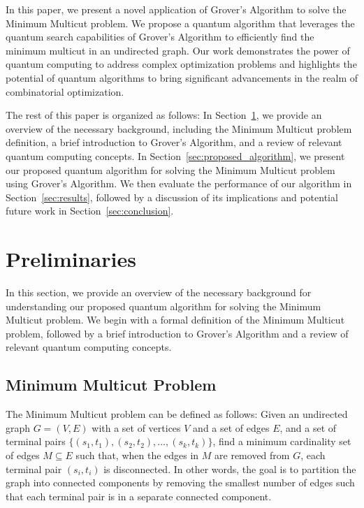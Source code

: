 In this paper, we present a novel application of Grover's Algorithm to solve the Minimum Multicut problem. We propose a quantum algorithm that leverages the quantum search capabilities of Grover's Algorithm to efficiently find the minimum multicut in an undirected graph. Our work demonstrates the power of quantum computing to address complex optimization problems and highlights the potential of quantum algorithms to bring significant advancements in the realm of combinatorial optimization.

The rest of this paper is organized as follows: In Section~\ref{sec:preliminaries}, we provide an overview of the necessary background, including the Minimum Multicut problem definition, a brief introduction to Grover's Algorithm, and a review of relevant quantum computing concepts. In Section~\ref{sec:proposed_algorithm}, we present our proposed quantum algorithm for solving the Minimum Multicut problem using Grover's Algorithm. We then evaluate the performance of our algorithm in Section~\ref{sec:results}, followed by a discussion of its implications and potential future work in Section~\ref{sec:conclusion}.

\section{Preliminaries}\label{sec:preliminaries}

In this section, we provide an overview of the necessary background for understanding our proposed quantum algorithm for solving the Minimum Multicut problem. We begin with a formal definition of the Minimum Multicut problem, followed by a brief introduction to Grover's Algorithm and a review of relevant quantum computing concepts.

\subsection{Minimum Multicut Problem}\label{subsec:min_multicut}

The Minimum Multicut problem can be defined as follows: Given an undirected graph $G = (V, E)$ with a set of vertices $V$ and a set of edges $E$, and a set of terminal pairs $\{(s_1, t_1), (s_2, t_2), \ldots, (s_k, t_k)\}$, find a minimum cardinality set of edges $M \subseteq E$ such that, when the edges in $M$ are removed from $G$, each terminal pair $(s_i, t_i)$ is disconnected. In other words, the goal is to partition the graph into connected components by removing the smallest number of edges such that each terminal pair is in a separate connected component.

